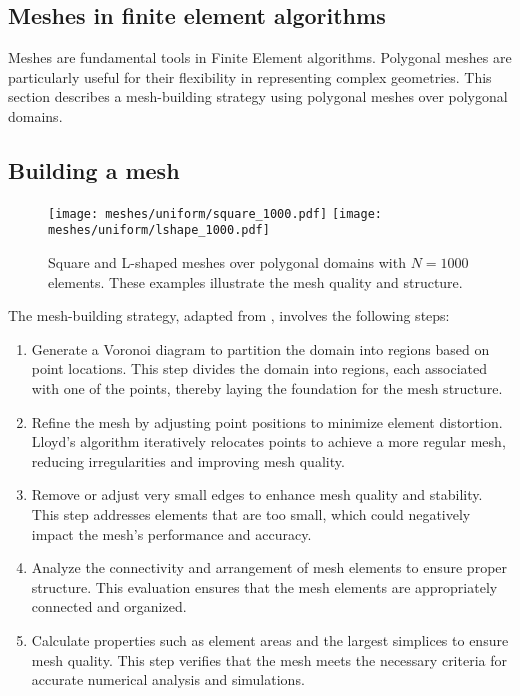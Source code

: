 \subsection{Meshes in finite element algorithms}

Meshes are fundamental tools in Finite Element algorithms. Polygonal meshes are particularly useful for their flexibility in representing complex geometries. This section describes a mesh-building strategy using polygonal meshes over polygonal domains.

\subsection{Building a mesh}

\begin{figure}[!ht]
    \centering
    \texttt{[image: meshes/uniform/square\_1000.pdf]}
    \texttt{[image: meshes/uniform/lshape\_1000.pdf]}
    \caption{Square and L-shaped meshes over polygonal domains with $N = 1000$ elements. These examples illustrate the mesh quality and structure.}
\end{figure}

The mesh-building strategy, adapted from \cite{Talischi2012}, involves the following steps:

\begin{enumerate}
    \item Generate a Voronoi diagram to partition the domain into regions based on point locations. This step divides the domain into regions, each associated with one of the points, thereby laying the foundation for the mesh structure.
    \item Refine the mesh by adjusting point positions to minimize element distortion. Lloyd's algorithm iteratively relocates points to achieve a more regular mesh, reducing irregularities and improving mesh quality.
    \item Remove or adjust very small edges to enhance mesh quality and stability. This step addresses elements that are too small, which could negatively impact the mesh's performance and accuracy.
    \item Analyze the connectivity and arrangement of mesh elements to ensure proper structure. This evaluation ensures that the mesh elements are appropriately connected and organized.
    \item Calculate properties such as element areas and the largest simplices to ensure mesh quality. This step verifies that the mesh meets the necessary criteria for accurate numerical analysis and simulations.
\end{enumerate}

